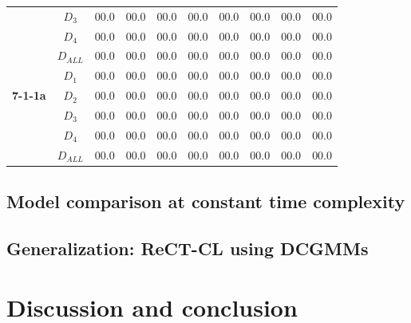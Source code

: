 \documentclass{article} %
\begin{document}
\begin{table}
\begin{tabular}{| c c | c c c c || c c c c |}
	                                        & $D_3$     & 00.0 & 00.0 & 00.0 & 00.0     & 00.0 & 00.0 & 00.0 & 00.0 \\
	                                        & $D_4$     & 00.0 & 00.0 & 00.0 & 00.0     & 00.0 & 00.0 & 00.0 & 00.0 \\
	                                        & $D_{ALL}$ & 00.0 & 00.0 & 00.0 & 00.0     & 00.0 & 00.0 & 00.0 & 00.0 \\
	\hline
	\multirow{3}{3.25em}{\textbf{7-1-1a}}   & $D_1$     & 00.0 & 00.0 & 00.0 & 00.0     & 00.0 & 00.0 & 00.0 & 00.0 \\
	                                        & $D_2$     & 00.0 & 00.0 & 00.0 & 00.0     & 00.0 & 00.0 & 00.0 & 00.0 \\
	                                        & $D_3$     & 00.0 & 00.0 & 00.0 & 00.0     & 00.0 & 00.0 & 00.0 & 00.0 \\
	                                        & $D_4$     & 00.0 & 00.0 & 00.0 & 00.0     & 00.0 & 00.0 & 00.0 & 00.0 \\
	                                        & $D_{ALL}$ & 00.0 & 00.0 & 00.0 & 00.0     & 00.0 & 00.0 & 00.0 & 00.0 \\
	\hline
\end{tabular}
\end{table}
\subsection{Model comparison at constant time complexity}
\subsection{Generalization: ReCT-CL using DCGMMs}

\section{Discussion and conclusion}
%
\end{document}
